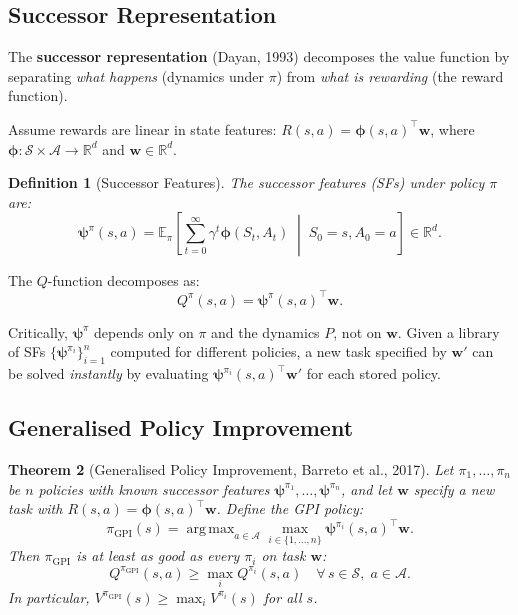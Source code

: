 \documentclass[11pt,a4paper]{article}
\newtheorem{theorem}{Theorem}[section]
\newtheorem{definition}[theorem]{Definition}
\newcommand{\E}{\mathbb{E}}
\newcommand{\R}{\mathbb{R}}
\newcommand{\cS}{\mathcal{S}}
\newcommand{\cA}{\mathcal{A}}
\newcommand{\Qpi}{Q^{\pi}}
\DeclareMathOperator*{\argmax}{arg\,max}
\begin{document}
\subsection{Successor Representation}

The \textbf{successor representation} (Dayan, 1993) decomposes the value function
by separating \emph{what happens} (dynamics under $\pi$) from \emph{what is rewarding}
(the reward function).

Assume rewards are linear in state features: $R(s, a) = \boldsymbol{\phi}(s, a)^\top \mathbf{w}$,
where $\boldsymbol{\phi} : \cS \times \cA \to \R^d$ and $\mathbf{w} \in \R^d$.

\begin{definition}[Successor Features]
The successor features (SFs) under policy $\pi$ are:
\[
  \boldsymbol{\psi}^\pi(s, a) = \E_\pi\!\left[\sum_{t=0}^\infty \gamma^t \boldsymbol{\phi}(S_t, A_t) \;\middle|\; S_0 = s, A_0 = a\right] \in \R^d.
\]
\end{definition}

The $Q$-function decomposes as:
\begin{equation}
  \Qpi(s, a) = \boldsymbol{\psi}^\pi(s, a)^\top \mathbf{w}. \label{eq:sf-decomp}
\end{equation}

Critically, $\boldsymbol{\psi}^\pi$ depends only on $\pi$ and the dynamics $P$, not on $\mathbf{w}$.
Given a library of SFs $\{\boldsymbol{\psi}^{\pi_i}\}_{i=1}^n$ computed for different policies,
a new task specified by $\mathbf{w}'$ can be solved \emph{instantly}
by evaluating $\boldsymbol{\psi}^{\pi_i}(s,a)^\top \mathbf{w}'$ for each stored policy.

\subsection{Generalised Policy Improvement}

\begin{theorem}[Generalised Policy Improvement, Barreto et al., 2017]
\label{thm:gpi}
Let $\pi_1, \ldots, \pi_n$ be $n$ policies with known successor features
$\boldsymbol{\psi}^{\pi_1}, \ldots, \boldsymbol{\psi}^{\pi_n}$, and let $\mathbf{w}$ specify a new task with
$R(s,a) = \boldsymbol{\phi}(s,a)^\top \mathbf{w}$. Define the GPI policy:
\[
  \pi_{\mathrm{GPI}}(s) = \argmax_{a \in \cA} \max_{i \in \{1,\ldots,n\}} \boldsymbol{\psi}^{\pi_i}(s, a)^\top \mathbf{w}.
\]
Then $\pi_{\mathrm{GPI}}$ is at least as good as every $\pi_i$ on task $\mathbf{w}$:
\[
  Q^{\pi_{\mathrm{GPI}}}(s, a) \geq \max_{i} Q^{\pi_i}(s, a) \quad \forall\, s \in \cS,\; a \in \cA.
\]
In particular, $V^{\pi_{\mathrm{GPI}}}(s) \geq \max_i V^{\pi_i}(s)$ for all $s$.
\end{theorem}
\end{document}
